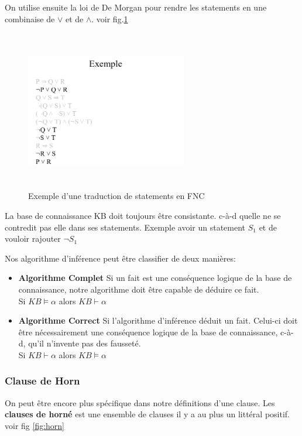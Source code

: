 \documentclass[oneside]{book}
\begin{document}
\noindent On utilise ensuite la loi de De Morgan pour rendre les statements en une combinaise de $\vee$ et de $\wedge$. voir fig.\ref{fig:exemple_inference}

\begin{figure}[h!t]
\centering
\includegraphics[width = 7cm, height = 7cm, keepaspectratio]{exemple_inference.png}
\caption{Exemple d'une traduction de statements en FNC}
\label{fig:exemple_inference}
\end{figure}

\noindent La base de connaissance KB doit toujours être consistante. c-à-d quelle ne se contredit pas elle dans ses statements. Exemple avoir un statement $S_1$ et de vouloir rajouter $\neg S_1$

\noindent Nos algorithme d'inférence peut être classifier de deux manières:

\begin{itemize}
\item \textbf{Algorithme Complet} Si un fait est une conséquence logique de la base de connaissance, notre algorithme doit être capable de déduire ce fait.\\
Si $KB \models \alpha$ alors $KB \vdash \alpha$

\item \textbf{Algorithme Correct} Si l'algorithme d'inférence déduit un fait. Celui-ci doit être nécessairement une conséquence logique de la base de connaissance, c-à-d, qu'il n'invente pas des fausseté. \\
Si $KB \vdash \alpha$ alors $KB \models \alpha$
\end{itemize}

\subsubsection{Clause de Horn}
On peut être encore plus spécifique dans notre définitions d'une clause. Les \textbf{clauses de horné} est une ensemble de clauses il y a au plus un littéral positif. voir fig \ref{fig:horn} 
\end{document}
